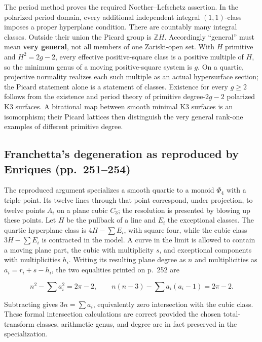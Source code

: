 The period method proves the required Noether--Lefschetz assertion. In the polarized period domain, every additional independent integral \((1,1)\)-class imposes a proper hyperplane condition. There are countably many integral classes. Outside their union the Picard group is \(\mathbb Z H\). Accordingly ``general'' must mean \textbf{very general}, not all members of one Zariski-open set. With \(H\) primitive and \(H^2=2g-2\), every effective positive-square class is a positive multiple of \(H\), so the minimum genus of a moving positive-square system is \(g\). On a quartic, projective normality realizes each such multiple as an actual hypersurface section; the Picard statement alone is a statement of classes. Existence for every \(g\ge2\) follows from the existence and period theory of primitive degree-\(2g-2\) polarized K3 surfaces. A birational map between smooth minimal K3 surfaces is an isomorphism; their Picard lattices then distinguish the very general rank-one examples of different primitive degree.

\subsection{Franchetta's degeneration as reproduced by Enriques (pp.~251--254)}\label{cp2-vii-2-4}

The reproduced argument specializes a smooth quartic to a monoid \(\Phi_4\) with a triple point. Its twelve lines through that point correspond, under projection, to twelve points \(A_i\) on a plane cubic \(C_3\); the resolution is presented by blowing up these points. Let \(H\) be the pullback of a line and \(E_i\) the exceptional classes. The quartic hyperplane class is \(4H-\sum E_i\), with square four, while the cubic class \(3H-\sum E_i\) is contracted in the model. A curve in the limit is allowed to contain a moving plane part, the cubic with multiplicity \(s\), and exceptional components with multiplicities \(h_i\). Writing its resulting plane degree as \(n\) and multiplicities as \(a_i=r_i+s-h_i\), the two equalities printed on p.~252 are

\[
n^2-\sum a_i^2=2\pi-2,
\qquad n(n-3)-\sum a_i(a_i-1)=2\pi-2.
\]

Subtracting gives \(3n=\sum a_i\), equivalently zero intersection with the cubic class. These formal intersection calculations are correct provided the chosen total-transform classes, arithmetic genus, and degree are in fact preserved in the specialization.


